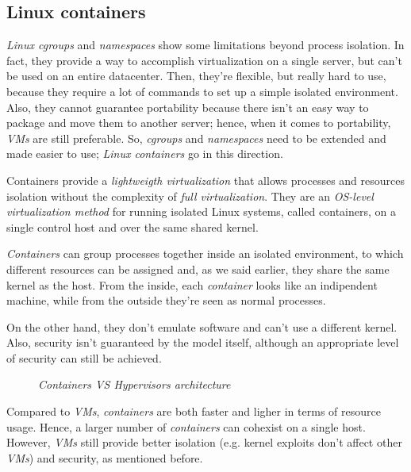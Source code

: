 \subsection{Linux containers}
\emph{Linux cgroups} and \emph{namespaces} show some limitations beyond
process isolation. In fact, they provide a way to accomplish virtualization on
a single server, but can't be used on an entire datacenter. Then, they're
flexible, but really hard to use, because they require a lot of commands to
set up a simple isolated environment. Also, they cannot guarantee portability
because there isn't an easy way to package and move them to another server;
hence, when it comes to portability, \emph{VMs} are still preferable. So, \emph{cgroups}
and \emph{namespaces} need to be extended and made easier to use; \emph{Linux
containers} go in this direction.

Containers provide a \emph{lightweigth virtualization} that allows processes and
resources isolation without the complexity of \emph{full virtualization}. They
are an \emph{OS-level virtualization method} for running isolated Linux
systems, called containers, on a single control host and over the same shared
kernel.

\emph{Containers} can group processes together inside an isolated environment,
to which different resources can be assigned and, as we said earlier, they share
the same kernel as the host. From the inside, each \emph{container} looks like
an indipendent machine, while from the outside they're seen as normal processes.

On the other hand, they don't emulate software and can't use a different kernel.
Also, security isn't guaranteed by the model itself, although an appropriate
level of security can still be achieved.

\begin{figure}[ht!]
    \centering
    \hspace{2.5cm}
    \caption{\emph{Containers VS Hypervisors architecture}}
\end{figure}

\noindent
Compared to \emph{VMs}, \emph{containers} are both faster and ligher in terms of
resource usage. Hence, a larger number of \emph{containers} can cohexist on
a single host. However, \emph{VMs} still provide better isolation (e.g. kernel
exploits don't affect other \emph{VMs}) and security, as mentioned before.

